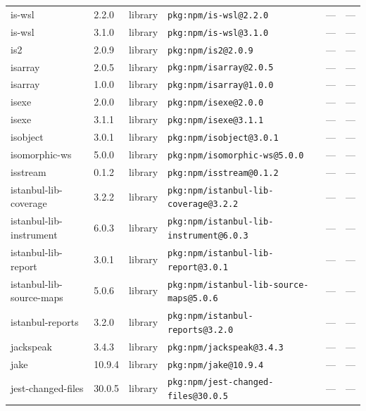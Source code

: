 \documentclass[11pt,a4paper]{article}
\begin{document}
\begin{longtable}{|p{4cm}|p{2cm}|p{1.6cm}|p{5cm}|p{1.5cm}|p{3.5cm}|}
\raggedright is-wsl & 2.2.0 & library & \small\texttt{pkg:npm/is-wsl@2.2.0} & — & \small — \\
\raggedright is-wsl & 3.1.0 & library & \small\texttt{pkg:npm/is-wsl@3.1.0} & — & \small — \\
\raggedright is2 & 2.0.9 & library & \small\texttt{pkg:npm/is2@2.0.9} & — & \small — \\
\raggedright isarray & 2.0.5 & library & \small\texttt{pkg:npm/isarray@2.0.5} & — & \small — \\
\raggedright isarray & 1.0.0 & library & \small\texttt{pkg:npm/isarray@1.0.0} & — & \small — \\
\raggedright isexe & 2.0.0 & library & \small\texttt{pkg:npm/isexe@2.0.0} & — & \small — \\
\raggedright isexe & 3.1.1 & library & \small\texttt{pkg:npm/isexe@3.1.1} & — & \small — \\
\raggedright isobject & 3.0.1 & library & \small\texttt{pkg:npm/isobject@3.0.1} & — & \small — \\
\raggedright isomorphic-ws & 5.0.0 & library & \small\texttt{pkg:npm/isomorphic-ws@5.0.0} & — & \small — \\
\raggedright isstream & 0.1.2 & library & \small\texttt{pkg:npm/isstream@0.1.2} & — & \small — \\
\raggedright istanbul-lib-coverage & 3.2.2 & library & \small\texttt{pkg:npm/istanbul-lib-coverage@3.2.2} & — & \small — \\
\raggedright istanbul-lib-instrument & 6.0.3 & library & \small\texttt{pkg:npm/istanbul-lib-instrument@6.0.3} & — & \small — \\
\raggedright istanbul-lib-report & 3.0.1 & library & \small\texttt{pkg:npm/istanbul-lib-report@3.0.1} & — & \small — \\
\raggedright istanbul-lib-source-maps & 5.0.6 & library & \small\texttt{pkg:npm/istanbul-lib-source-maps@5.0.6} & — & \small — \\
\raggedright istanbul-reports & 3.2.0 & library & \small\texttt{pkg:npm/istanbul-reports@3.2.0} & — & \small — \\
\raggedright jackspeak & 3.4.3 & library & \small\texttt{pkg:npm/jackspeak@3.4.3} & — & \small — \\
\raggedright jake & 10.9.4 & library & \small\texttt{pkg:npm/jake@10.9.4} & — & \small — \\
\raggedright jest-changed-files & 30.0.5 & library & \small\texttt{pkg:npm/jest-changed-files@30.0.5} & — & \small — \\

\end{longtable}
\end{document}
